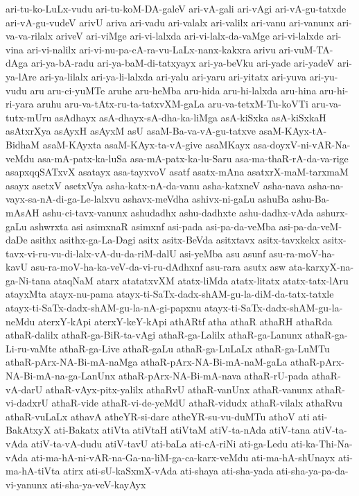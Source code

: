 {ari-tu-ko-LuLx-vudu
ari-tu-koM-DA-galeV
ari-vA-gali
ari-vAgi
ari-vA-gu-tatxde
ari-vA-gu-vudeV
arivU
ariva
ari-vadu
ari-valalx
ari-valilx
ari-vanu
ari-vanunx
ari-va-va-rilalx
ariveV
ari-viMge
ari-vi-lalxda
ari-vi-lalx-da-vaMge
ari-vi-lalxde
ari-vina
ari-vi-nalilx
ari-vi-nu-pa-cA-ra-vu-LaLx-nanx-kakxra
arivu
ari-vuM-TA-dAga
ari-ya-bA-radu
ari-ya-baM-di-tatxyayx
ari-ya-beVku
ari-yade
ari-yadeV
ari-ya-lAre
ari-ya-lilalx
ari-ya-li-lalxda
ari-yalu
ari-yaru
ari-yitatx
ari-yuva
ari-yu-vudu
aru
aru-ci-yuMTe
aruhe
aru-heMba
aru-hida
aru-hi-lalxda
aru-hina
aru-hi-ri-yara
aruhu
aru-va-tAtx-ru-ta-tatxvXM-gaLa
aru-va-tetxM-Tu-koVTi
aru-va-tutx-mUru
asAdhayx
asA-dhayx-sA-dha-ka-liMga
asA-kiSxka
asA-kiSxkaH
asAtxrXya
asAyxH
asAyxM
asU
asaM-Ba-va-vA-gu-tatxve
asaM-KAyx-tA-BidhaM
asaM-KAyxta
asaM-KAyx-ta-vA-give
asaMKayx
asa-doyxV-ni-vAR-Na-veMdu
asa-mA-patx-ka-luSa
asa-mA-patx-ka-lu-Saru
asa-ma-thaR-rA-da-va-rige
asapxqqSATxvX
asatayx
asa-tayxvoV
asatf
asatx-mAna
asatxrX-maM-tarxmaM
asayx
asetxV
asetxVya
asha-katx-nA-da-vanu
asha-katxneV
asha-nava
asha-na-vayx-sa-nA-di-ga-Le-lalxvu
ashavx-meVdha
ashivx-ni-gaLu
ashuBa
ashu-Ba-mAsAH
ashu-ci-tavx-vanunx
ashudadhx
ashu-dadhxte
ashu-dadhx-vAda
ashurx-gaLu
ashwrxta
asi
asimxnaR
asimxnf
asi-pada
asi-pa-da-veMba
asi-pa-da-veM-daDe
asithx
asithx-ga-La-Dagi
asitx
asitx-BeVda
asitxtavx
asitx-tavxkekx
asitx-tavx-vi-ru-vu-di-lalx-vA-du-da-riM-dalU
asi-yeMba
asu
asunf
asu-ra-moV-ha-kavU
asu-ra-moV-ha-ka-veV-da-vi-ru-dAdhxnf
asu-rara
asutx
asw
ata-karxyX-na-ga-Ni-tana
ataqNaM
atarx
atatatxvXM
atatx-liMda
atatx-litatx
atatx-tatx-lAru
atayxMta
atayx-nu-pama
atayx-ti-SaTx-dadx-shAM-gu-la-diM-da-tatx-tatxle
atayx-ti-SaTx-dadx-shAM-gu-la-nA-gi-papxnu
atayx-ti-SaTx-dadx-shAM-gu-la-neMdu
aterxY-kApi
aterxY-keY-kApi
athARtf
atha
athaR
athaRH
athaRda
athaR-dalilx
athaR-ga-BiR-ta-vAgi
athaR-ga-Lalilx
athaR-ga-Lanunx
athaR-ga-Li-ru-vaMte
athaR-ga-Live
athaR-gaLu
athaR-ga-LuLaLx
athaR-ga-LuMTu
athaR-pArx-NA-Bi-mA-naMga
athaR-pArx-NA-Bi-mA-naM-gaLa
athaR-pArx-NA-Bi-mA-na-ga-LanUnx
athaR-pArx-NA-Bi-mA-nava
athaR-rU-pada
athaR-vA-darU
athaR-vAyx-pitx-yalilx
athaRvU
athaR-vanUnx
athaR-vanunx
athaR-vi-dadxrU
athaR-vide
athaR-vi-de-yeMdU
athaR-vidudx
athaR-vilalx
athaRvu
athaR-vuLaLx
athavA
atheYR-si-dare
atheYR-su-vu-duMTu
athoV
ati
ati-BakAtxyX
ati-Bakatx
atiVta
atiVtaH
atiVtaM
atiV-ta-nAda
atiV-tana
atiV-ta-vAda
atiV-ta-vA-dudu
atiV-tavU
ati-baLa
ati-cA-riNi
ati-ga-Ledu
ati-ka-Thi-Na-vAda
ati-ma-hA-ni-vAR-na-Ga-na-liM-ga-ca-karx-veMdu
ati-ma-hA-shUnayx
ati-ma-hA-tiVta
atirx
ati-sU-kaSxmX-vAda
ati-shaya
ati-sha-yada
ati-sha-ya-pa-da-vi-yanunx
ati-sha-ya-veV-kayAyx
}
